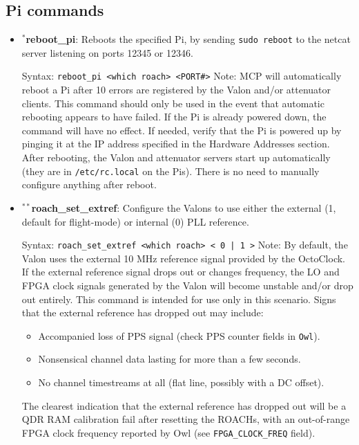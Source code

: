 \subsection{Pi commands}
\begin{itemize}[leftmargin=*,label={}]

\item $^{*}$\textbf{reboot\_pi}: Reboots the specified Pi, by sending \texttt{sudo reboot} to the netcat server listening on ports 12345 or 12346.

Syntax: \texttt{reboot\_pi <which roach> <PORT\#>}
Note: MCP will automatically reboot a Pi after 10 errors are registered by the Valon and/or attenuator clients. This command should only be used in the event that automatic rebooting appears to have failed. If the Pi is already powered down, the command will have no effect. If needed, verify that the Pi is powered up by pinging it at the IP address specified in the Hardware Addresses section. After rebooting, the Valon and attenuator servers start up automatically (they are in \texttt{/etc/rc.local} on the Pis). There is no need to manually configure anything after reboot.

\item $^{**}$\textbf{roach\_set\_extref}: Configure the Valons to use either the external (1, default for flight-mode) or internal (0) PLL reference.

Syntax: \texttt{roach\_set\_extref <which roach> < 0 | 1 >}
Note: By default, the Valon uses the external 10 MHz reference signal provided by the OctoClock. If the external reference signal drops out or changes frequency, the LO and FPGA clock signals generated by the Valon will become unstable and/or drop out entirely. This command is intended for use only in this scenario. Signs that the external reference has dropped out may include:
\begin{itemize}
  \item Accompanied loss of PPS signal (check PPS counter fields in \texttt{Owl}).
  \item Nonsensical channel data lasting for more than a few seconds.
  \item No channel timestreams at all (flat line, possibly with a DC offset).
\end{itemize}
The clearest indication that the external reference has dropped out will be a QDR RAM calibration fail after resetting the ROACHs, with an out-of-range FPGA clock frequency reported by Owl (see \texttt{FPGA\_CLOCK\_FREQ} field).


\end{itemize}
